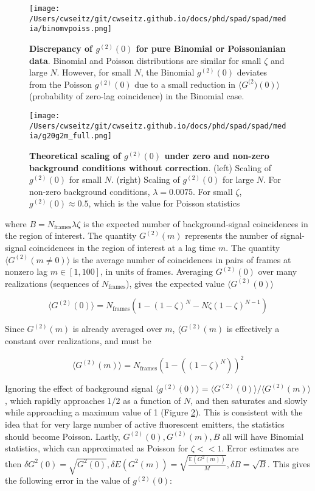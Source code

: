 \begin{figure}[t]
\centering
\texttt{[image: /Users/cwseitz/git/cwseitz.github.io/docs/phd/spad/spad/media/binomvpoiss.png]}
\caption{\textbf{Discrepancy of $g^{(2)}(0)$ for pure Binomial or Poissonianian data}. Binomial and Poisson distributions are similar for small $\zeta$ and large $N$. However, for small $N$, the Binomial $g^{(2)}(0)$ deviates from the Poisson $g^{(2)}(0)$ due to a small reduction in $\langle G^{(2})(0)\rangle$ (probability of zero-lag coincidence) in the Binomial case.}
\label{fig:binomvpoiss}
\end{figure}   


\begin{figure}[t]
\centering
\texttt{[image: /Users/cwseitz/git/cwseitz.github.io/docs/phd/spad/spad/media/g20g2m\_full.png]}
\caption{\textbf{Theoretical scaling of $g^{(2)}(0)$ under zero and non-zero background conditions without correction}. (left) Scaling of $g^{(2)}(0)$ for small $N$. (right) Scaling of $g^{(2)}(0)$ for large $N$. For non-zero background conditions, $\lambda = 0.0075$. For small $\zeta$, $g^{(2)}(0)\approx 0.5$, which is the value for Poisson statistics}
\label{fig:fig8}
\end{figure}   

where $B = N_{\mathrm{frames}}\lambda\zeta$ is the expected number of background-signal coincidences in the region of interest. The quantity $G^{(2)}(m)$ represents the number of signal-signal coincidences in the region of interest at a lag time $m$. The quantity $\langle G^{(2)}(m\neq 0)\rangle$ is the average number of coincidences in pairs of frames at nonzero lag $m \in [1,100]$, in units of frames. Averaging $G^{(2)}(0)$ over many realizations (sequences of $N_{\mathrm{frames}}$), gives the expected value $\langle G^{(2)}(0)\rangle $

\begin{equation}
\langle G^{(2)}(0)\rangle = N_{\mathrm{frames}}(1 - (1-\zeta)^N - N\zeta (1-\zeta)^{N-1})
\end{equation}

Since $G^{(2)}(m)$ is already averaged over $m$, $\langle G^{(2)}(m) $ is effectively a constant over realizations, and must be

\begin{equation}
\langle G^{(2)}(m)\rangle =  N_{\mathrm{frames}} \left(1 - \left((1-\zeta)^N\right)\right)^2
\end{equation}

Ignoring the effect of background signal $\langle g^{(2)}(0)\rangle =\langle G^{(2)}(0)\rangle/\langle G^{(2)}(m)\rangle$, which rapidly approaches $1/2$ as a function of $N$, and then saturates and slowly while approaching a maximum value of 1 (Figure \ref{fig:fig8}). This is consistent with the idea that for very large number of active fluorescent emitters, the statistics should become Poisson. Lastly, $G^{(2)}(0),G^{(2)}(m),B$ all will have Binomial statistics, which can approximated as Poisson for $\zeta << 1$. Error estimates are then $\delta G^2(0) = \sqrt{G^2(0)}, \delta E(G^2(m)) = \sqrt{\frac{\mathbb{E}(G^2(m))}{M}}, \delta B = \sqrt{B}$. This gives the following error in the value of $g^{(2)}(0)$:

